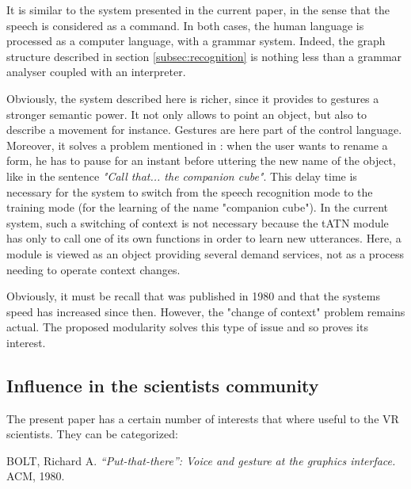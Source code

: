 \documentclass[a4paper]{article}
\begin{document}
It is similar to the system presented in the current paper, in the sense that the speech is considered as a command. In both cases, the human language is processed as a computer language, with a grammar system. Indeed, the graph structure described in section \ref{subsec:recognition} is nothing less than a grammar analyser coupled with an interpreter.

Obviously, the system described here is richer, since it provides to gestures a stronger semantic power. It not only allows to point an object, but also to describe a movement for instance. Gestures are here part of the control language. Moreover, it solves a problem mentioned in \cite{putthatthere}: when the user wants to rename a form, he has to pause for an instant before uttering the new name of the object, like in the sentence \textit{"Call that... the companion cube"}. This delay time is necessary for the system to switch from the speech recognition mode to the training mode (for the learning of the name "companion cube"). In the current system, such a switching of context is not necessary because the tATN module has only to call one of its own functions in order to learn new utterances. Here, a module is viewed as an object providing several demand services, not as a process needing to operate context changes.

Obviously, it must be recall that \cite{putthatthere} was published in 1980 and that the systems speed has increased since then. However, the "change of context" problem remains actual. The proposed modularity solves this type of issue and so proves its interest.

\subsection{Influence in the scientists community}

The present paper has a certain number of interests that where useful to the VR scientists. They can be categorized:

\begin{thebibliography}{1}
	 BOLT, Richard A. \textit{“Put-that-there”: Voice and gesture at the graphics interface.} ACM, 1980.
\end{thebibliography}
\end{document}
